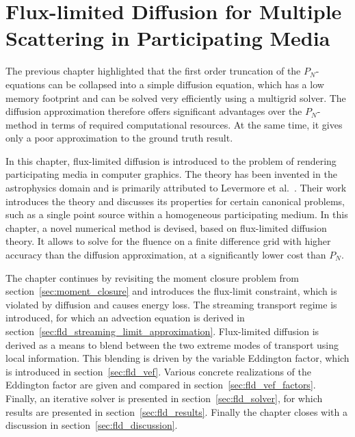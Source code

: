\chapter[FLD for Multiple Scattering in Participating Media]{Flux-limited Diffusion for Multiple Scattering in Participating Media}
\label{sec:fld}

The previous chapter highlighted that the first order truncation of the $P_N$-equations can be collapsed into a simple diffusion equation, which has a low memory footprint and can be solved very efficiently using a multigrid solver. The diffusion approximation therefore offers significant advantages over the $P_N$-method in terms of required computational resources. At the same time, it gives only a poor approximation to the ground truth result.

In this chapter, flux-limited diffusion is introduced to the problem of rendering participating media in computer graphics. The theory has been invented in the astrophysics domain and is primarily attributed to Levermore et al.~\cite{Levermore81}. Their work introduces the theory and discusses its properties for certain canonical problems, such as a single point source within a homogeneous participating medium. In this chapter, a novel numerical method is devised, based on flux-limited diffusion theory. It allows to solve for the fluence on a finite difference grid with higher accuracy than the diffusion approximation, at a significantly lower cost than $P_N$.

The chapter continues by revisiting the moment closure problem from section~\ref{sec:moment_closure} and introduces the flux-limit constraint, which is violated by diffusion and causes energy loss. The streaming transport regime is introduced, for which an advection equation is derived in section~\ref{sec:fld_streaming_limit_approximation}. Flux-limited diffusion is derived as a means to blend between the two extreme modes of transport using local information. This blending is driven by the variable Eddington factor, which is introduced in section~\ref{sec:fld_vef}. Various concrete realizations of the Eddington factor are given and compared in section~\ref{sec:fld_vef_factors}. Finally, an iterative solver is presented in section~\ref{sec:fld_solver}, for which results are presented in section~\ref{sec:fld_results}. Finally the chapter closes with a discussion in section~\ref{sec:fld_discussion}.













